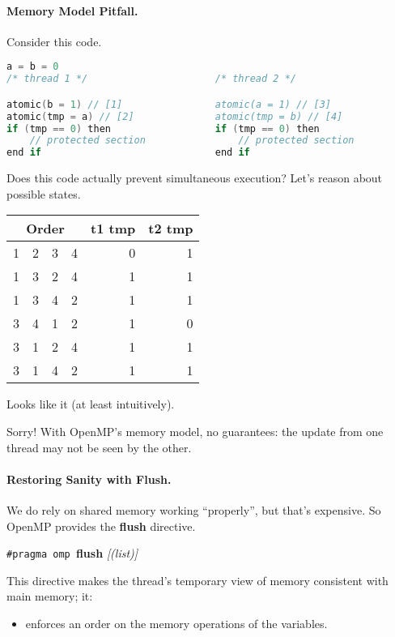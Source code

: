 \paragraph{Memory Model Pitfall.} Consider this code.

  \begin{lstlisting}[language=C]
                    a = b = 0
/* thread 1 */                      /* thread 2 */

atomic(b = 1) // [1]                atomic(a = 1) // [3]
atomic(tmp = a) // [2]              atomic(tmp = b) // [4]
if (tmp == 0) then                  if (tmp == 0) then
    // protected section                // protected section
end if                              end if
  \end{lstlisting}

Does this code actually prevent simultaneous execution?
Let's reason about possible states.

  \begin{center}
  \begin{tabular}{r r r r | r r}
    \multicolumn{4}{c|}{Order} & t1 tmp & t2 tmp\\
    \hline
    1 & 2 & 3 & 4 & 0 & 1\\
    1 & 3 & 2 & 4 & 1 & 1\\
    1 & 3 & 4 & 2 & 1 & 1\\
    3 & 4 & 1 & 2 & 1 & 0\\
    3 & 1 & 2 & 4 & 1 & 1\\
    3 & 1 & 4 & 2 & 1 & 1\\
  \end{tabular}
  \end{center}

Looks like it (at least intuitively).

Sorry! With OpenMP's memory model, no guarantees:
the update from one thread may not be seen by the other.

\paragraph{Restoring Sanity with Flush.} We do rely on 
shared memory working ``properly'', but that's expensive.
So OpenMP provides the {\bf flush} directive.

  \begin{center}
    {\tt \#pragma omp }{\bf flush} {\it[(list)]}
  \end{center}

This directive makes the thread's temporary view of memory consistent with main
      memory; it:
\begin{itemize}
    \item enforces an order on the memory operations of the variables.
\end{itemize}

